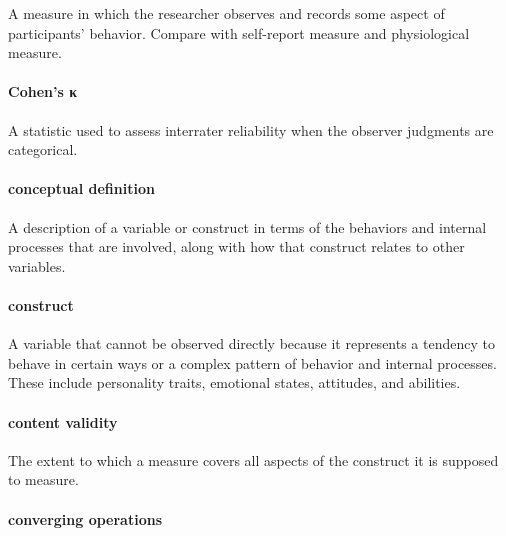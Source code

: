 \documentclass[
]{krantz}
\begin{document}
A measure in which the researcher observes and records some aspect of participants' behavior. Compare with self-report measure and physiological measure.

\hypertarget{cohens-ux3ba}{%
\paragraph*{Cohen's κ}\label{cohens-ux3ba}}

A statistic used to assess interrater reliability when the observer judgments are categorical.

\hypertarget{conceptual-definition}{%
\paragraph*{conceptual definition}\label{conceptual-definition}}

A description of a variable or construct in terms of the behaviors and internal processes that are involved, along with how that construct relates to other variables.

\hypertarget{construct}{%
\paragraph*{construct}\label{construct}}

A variable that cannot be observed directly because it represents a tendency to behave in certain ways or a complex pattern of behavior and internal processes. These include personality traits, emotional states, attitudes, and abilities.

\hypertarget{content-validity-1}{%
\paragraph*{content validity}\label{content-validity-1}}

The extent to which a measure covers all aspects of the construct it is supposed to measure.

\hypertarget{converging-operations}{%
\paragraph*{converging operations}\label{converging-operations}}
\end{document}
